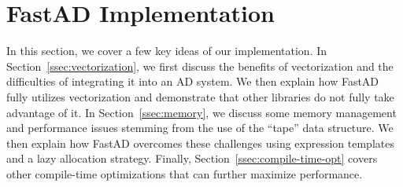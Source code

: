 \section{FastAD Implementation}\label{sec:fastad}

In this section, we cover a few key ideas of our implementation\footnotemark.
In Section~\ref{ssec:vectorization},
we first discuss the benefits of vectorization and the difficulties of integrating it into an AD system.
We then explain how FastAD fully utilizes vectorization
and demonstrate that other libraries do not fully take advantage of it. 
In Section~\ref{ssec:memory},
we discuss some memory management and performance issues
stemming from the use of the ``tape'' data structure.
We then explain how FastAD overcomes these challenges using expression templates
and a lazy allocation strategy.\@
Finally, Section~\ref{ssec:compile-time-opt} covers other compile-time optimizations 
that can further maximize performance.






